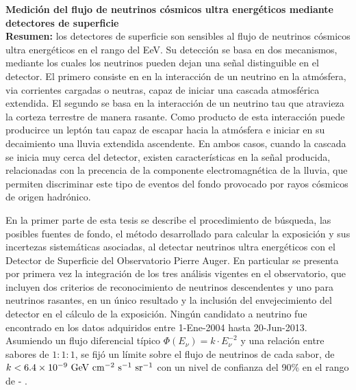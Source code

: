 \begin{titlepage}

$\,$\\[2.5cm]
\textbf{\Large  Medición del flujo de neutrinos cósmicos ultra energéticos mediante detectores de superficie}\\[2.5cm]

\noindent
\textbf{Resumen: }
los detectores de superficie son sensibles al flujo de neutrinos cósmicos ultra energéticos en el rango del EeV. 
Su detección se basa en dos mecanismos, mediante los cuales los neutrinos pueden dejan una señal distinguible en el detector.
El primero consiste en en la interacción de un neutrino en la atmósfera, via corrientes cargadas o neutras, capaz de iniciar una cascada atmosférica extendida.
El segundo se basa en la interacción de un neutrino tau que atravieza la corteza terrestre de manera rasante. 
Como producto de esta interacción puede producirce un leptón tau capaz de escapar hacia la atmósfera e iniciar en su decaimiento una lluvia extendida ascendente.
En ambos casos, cuando la cascada se inicia muy cerca del detector, existen características en la señal producida, relacionadas con la precencia de la componente electromagnética de la lluvia, que permiten discriminar este tipo de eventos del fondo provocado por rayos cósmicos de origen hadrónico.

En la primer parte de esta tesis se describe el procedimiento de búsqueda, las posibles fuentes de fondo, el método desarrollado para calcular la exposición y sus incertezas sistemáticas asociadas, al detectar neutrinos ultra energéticos con el Detector de Superficie del Observatorio Pierre Auger.
En particular se presenta por primera vez la integración de los tres análisis vigentes en el observatorio, que incluyen dos criterios de reconocimiento de neutrinos descendentes y uno para neutrinos rasantes, en un único resultado y la inclusión del envejecimiento del detector en el cálculo de la exposición.
Ningún candidato a neutrino fue encontrado en los datos adquiridos entre 1-Ene-2004 hasta 20-Jun-2013. Asumiendo un flujo diferencial típico $\Phi(E_\nu) = k\cdot E_\nu^{-2}$ y una relación entre sabores de $1:1:1$, se fijó un límite sobre el flujo de neutrinos de cada sabor, de $k < 6.4 \times 10^{-9}~{\rm GeV~cm^{-2}~s^{-1}~sr^{-1}}$ con un nivel de confianza del 90\% en el rango de  - .


\end{titlepage}
